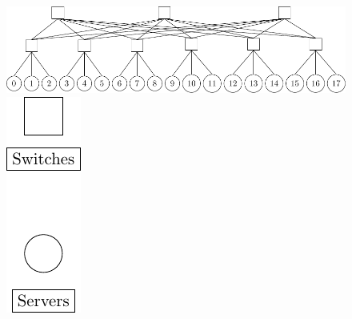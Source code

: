 \begin{figure}[t]
\begin{minipage}{.95\columnwidth}
        \includegraphics[width=\textwidth]{figures/topologies/leafspine}
    \end{minipage}\hfill
    \begin{minipage}{.15\columnwidth}
        \includegraphics[width=\textwidth]{figures/topologies/key}

\end{minipage}
\end{figure}
